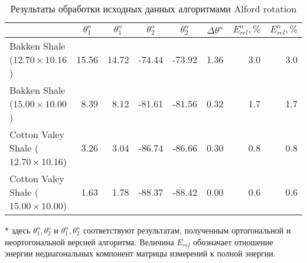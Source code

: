\documentclass[a4paper,11pt]{article}
\begin{document}
\begin{table}[h]
\footnotesize
\caption{Результаты обработки исходных данных алгоритмами Alford rotation}
\renewcommand{\arraystretch}{1.5}
\begin{tabularx}{\textwidth}{|X|rr|rr|r|rr|}
\hline	
				&\multicolumn{1}{c}{$\theta_1^o$} & \multicolumn{1}{c|}{$\theta_1^n$} & \multicolumn{1}{c}{$\theta_2^o$} & \multicolumn{1}{c|}{$\theta_2^n$} & \multicolumn{1}{c|}{$\Delta\theta^n$}& \multicolumn{1}{c}{$E_{rel}^o, \%$} & \multicolumn{1}{c|}{$E_{rel}^n, \%$} \\ \hline
\hline Bakken Shale ($12.70 \times 10.16$) & 15.56 & 14.72 & -74.44 & -73.92  & 1.36  & 3.0 & 3.0 \\
\hline Bakken Shale ($15.00 \times 10.00$) & 8.39 & 8.12 & -81.61 & -81.56 & 0.32 & 1.7 & 1.7 \\
\hline Cotton Valey Shale ($12.70 \times 10.16$) & 3.26 & 3.04 & -86.74 & -86.66  & 0.30 & 0.8 & 0.8 \\ 
\hline Cotton Valey Shale ($15.00 \times 10.00$) & 1.63 & 1.78 & -88.37 & -88.42  & 0.00  & 0.6 & 0.6 \\	   
 	   \hline
\end{tabularx} 
\begin{flushleft}
* здесь $\theta_1^o,\theta_2^o$ и $\theta_1^n,\theta_2^n$ соответствуют результатам, полученным ортогональной и неортогональной версией алгоритма. Величина $E_{rel}$ обозначает отношение энергии недиагональных компонент матрицы измерений к полной энергии.
\end{flushleft}
\label{tab:std_process_results}
\renewcommand{\arraystretch}{1.0}
\end{table}
\end{document}
